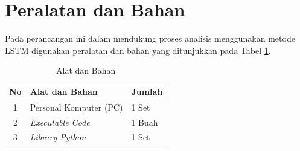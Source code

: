 %

\section{Peralatan dan Bahan}

Pada perancangan ini dalam mendukung proses analisis menggunakan metode LSTM digunakan peralatan dan bahan yang ditunjukkan pada Tabel \ref{tabel:alat dan bahan}.\par 
\begin{table}[h]
	\centering
	\caption{Alat dan Bahan}
	\begin{tabular}{|c|l|l|} 
		\hline
		\textbf{No} & \textbf{Alat dan Bahan}  & \textbf{Jumlah}  \\ 
		\hline
		1           & Personal Komputer (PC)   & 1 Set            \\ 
		\hline
		2           & \textit{Executable Code} & 1 Buah           \\ 
		\hline
		3           & \textit{Library Python}  & 1 Set            \\
		\hline
	\end{tabular}
%		
	\label{tabel:alat dan bahan}
\end{table}

